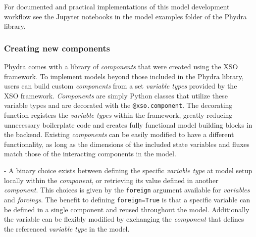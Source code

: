 \documentclass[journal abbreviation, manuscript]{copernicus}
\begin{document}
For documented and practical implementations of this model development workflow see the Jupyter notebooks in the model examples folder of the Phydra library.

\subsubsection{Creating new components}  \label{Section:CreatingXSOComponent}

Phydra comes with a library of \textit{components} that were created using the XSO framework. To implement models beyond those included in the Phydra library, users can build custom \textit{components} from a set \textit{variable types} provided by the XSO framework. \textit{Components} are simply Python classes that utilize these variable types and are decorated with the \texttt{@xso.component}. The decorating function registers the \textit{variable types} within the framework, greatly reducing unnecessary boilerplate code and creates fully functional model building blocks in the backend. Existing \textit{components} can be easily modified to have a different functionality, as long as the dimensions of the included state variables and fluxes match those of the interacting components in the model. 

- A binary choice exists between defining the specific \textit{variable type} at model setup locally within the \textit{component}, or retrieving its value defined in another \textit{component}. This choices is given by the \texttt{foreign} argument available for \textit{variables} and \textit{forcings}. The benefit to defining \texttt{foreign=True} is that a specific variable can be defined in a single component and reused throughout the model. Additionally the variable can be flexibly modified by exchanging the \textit{component} that defines the referenced \textit{variable type} in the model.
\end{document}
